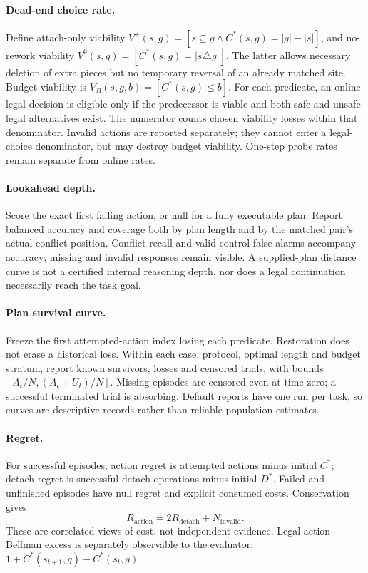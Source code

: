 \documentclass[10pt,twocolumn]{article}
\begin{document}
\paragraph{Dead-end choice rate.}
Define attach-only viability
$V^+(s,g)=[s\subseteq g\land C^*(s,g)=|g|-|s|]$, and no-rework viability
$V^0(s,g)=[C^*(s,g)=|s\triangle g|]$.
The latter allows necessary deletion of extra pieces but no temporary reversal
of an already matched site. Budget viability is
$V_B(s,g,b)=[C^*(s,g)\leq b]$.
For each predicate, an online legal decision is eligible only if the
predecessor is viable and both safe and unsafe legal alternatives exist.
The numerator counts chosen viability losses within that denominator.
Invalid actions are reported separately; they cannot enter a legal-choice
denominator, but may destroy budget viability.
One-step probe rates remain separate from online rates.

\paragraph{Lookahead depth.}
Score the exact first failing action, or null for a fully executable plan.
Report balanced accuracy and coverage both by plan length and by the
matched pair's actual conflict position. Conflict recall and valid-control
false alarms accompany accuracy; missing and invalid responses remain
visible. A supplied-plan distance curve is not a certified internal reasoning
depth, nor does a legal continuation necessarily reach the task goal.

\paragraph{Plan survival curve.}
Freeze the first attempted-action index losing each predicate.
Restoration does not erase a historical loss. Within each case, protocol,
optimal length and budget stratum, report known survivors, losses and
censored trials, with bounds $[A_t/N,(A_t+U_t)/N]$.
Missing episodes are censored even at time zero; a successful terminated
trial is absorbing. Default reports have one run per task, so curves are
descriptive records rather than reliable population estimates.

\paragraph{Regret.}
For successful episodes, action regret is attempted actions minus initial
$C^*$; detach regret is successful detach operations minus initial $D^*$.
Failed and unfinished episodes have null regret and explicit consumed costs.
Conservation gives
\[
R_{\mathrm{action}}=2R_{\mathrm{detach}}+N_{\mathrm{invalid}}.
\]
These are correlated views of cost, not independent evidence.
Legal-action Bellman excess is separately observable to the evaluator:
$1+C^*(s_{t+1},g)-C^*(s_t,g)$.
\end{document}
